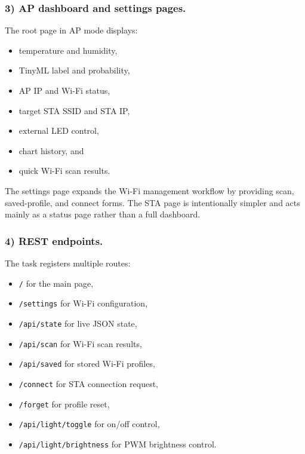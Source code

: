 \subsubsection*{3) AP dashboard and settings pages.}
The root page in AP mode displays:
\begin{itemize}
  \item temperature and humidity,
  \item TinyML label and probability,
  \item AP IP and Wi-Fi status,
  \item target STA SSID and STA IP,
  \item external LED control,
  \item chart history, and
  \item quick Wi-Fi scan results.
\end{itemize}
The settings page expands the Wi-Fi management workflow by providing scan,
saved-profile, and connect forms. The STA page is intentionally simpler and
acts mainly as a status page rather than a full dashboard.

\subsubsection*{4) REST endpoints.}
The task registers multiple routes:
\begin{itemize}
  \item \texttt{/} for the main page,
  \item \texttt{/settings} for Wi-Fi configuration,
  \item \texttt{/api/state} for live JSON state,
  \item \texttt{/api/scan} for Wi-Fi scan results,
  \item \texttt{/api/saved} for stored Wi-Fi profiles,
  \item \texttt{/connect} for STA connection request,
  \item \texttt{/forget} for profile reset,
  \item \texttt{/api/light/toggle} for on/off control,
  \item \texttt{/api/light/brightness} for PWM brightness control.
\end{itemize}

